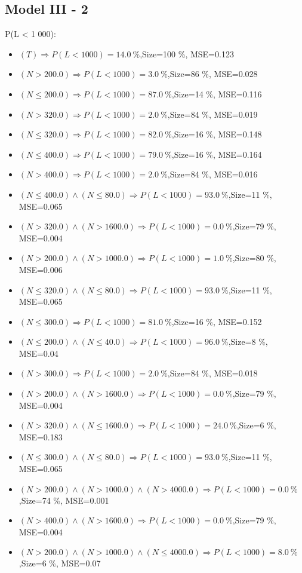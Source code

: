 \documentclass[numbered]{CSL}
\begin{document}
\subsection{Model III - 2}
P(L < 1 000):
\begin{itemize}
\item $(T) \Rightarrow P(L < 1 000) = 14.0~\%$,\hfill Size=100 \%, MSE=0.123
\item $(N > 200.0) \Rightarrow P(L < 1 000) = 3.0~\%$,\hfill Size=86 \%, MSE=0.028
\item $(N \leq 200.0) \Rightarrow P(L < 1 000) = 87.0~\%$,\hfill Size=14 \%, MSE=0.116
\item $(N > 320.0) \Rightarrow P(L < 1 000) = 2.0~\%$,\hfill Size=84 \%, MSE=0.019
\item $(N \leq 320.0) \Rightarrow P(L < 1 000) = 82.0~\%$,\hfill Size=16 \%, MSE=0.148
\item $(N \leq 400.0) \Rightarrow P(L < 1 000) = 79.0~\%$,\hfill Size=16 \%, MSE=0.164
\item $(N > 400.0) \Rightarrow P(L < 1 000) = 2.0~\%$,\hfill Size=84 \%, MSE=0.016
\item $(N \leq 400.0) \land (N \leq 80.0) \Rightarrow P(L < 1 000) = 93.0~\%$,\hfill Size=11 \%, MSE=0.065
\item $(N > 320.0) \land (N > 1600.0) \Rightarrow P(L < 1 000) = 0.0~\%$,\hfill Size=79 \%, MSE=0.004
\item $(N > 200.0) \land (N > 1000.0) \Rightarrow P(L < 1 000) = 1.0~\%$,\hfill Size=80 \%, MSE=0.006
\item $(N \leq 320.0) \land (N \leq 80.0) \Rightarrow P(L < 1 000) = 93.0~\%$,\hfill Size=11 \%, MSE=0.065
\item $(N \leq 300.0) \Rightarrow P(L < 1 000) = 81.0~\%$,\hfill Size=16 \%, MSE=0.152
\item $(N \leq 200.0) \land (N \leq 40.0) \Rightarrow P(L < 1 000) = 96.0~\%$,\hfill Size=8 \%, MSE=0.04
\item $(N > 300.0) \Rightarrow P(L < 1 000) = 2.0~\%$,\hfill Size=84 \%, MSE=0.018
\item $(N > 200.0) \land (N > 1600.0) \Rightarrow P(L < 1 000) = 0.0~\%$,\hfill Size=79 \%, MSE=0.004
\item $(N > 320.0) \land (N \leq 1600.0) \Rightarrow P(L < 1 000) = 24.0~\%$,\hfill Size=6 \%, MSE=0.183
\item $(N \leq 300.0) \land (N \leq 80.0) \Rightarrow P(L < 1 000) = 93.0~\%$,\hfill Size=11 \%, MSE=0.065
\item $(N > 200.0) \land (N > 1000.0) \land (N > 4000.0) \Rightarrow P(L < 1 000) = 0.0~\%$,\hfill Size=74 \%, MSE=0.001
\item $(N > 400.0) \land (N > 1600.0) \Rightarrow P(L < 1 000) = 0.0~\%$,\hfill Size=79 \%, MSE=0.004
\item $(N > 200.0) \land (N > 1000.0) \land (N \leq 4000.0) \Rightarrow P(L < 1 000) = 8.0~\%$,\hfill Size=6 \%, MSE=0.07
\end{itemize}
\end{document}
